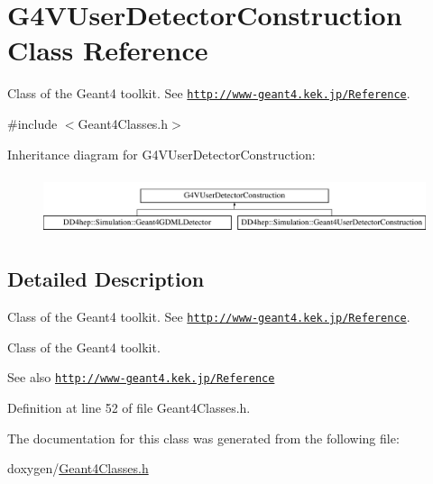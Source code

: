 \hypertarget{class_g4_v_user_detector_construction}{}\section{G4\+V\+User\+Detector\+Construction Class Reference}
\label{class_g4_v_user_detector_construction}


Class of the Geant4 toolkit. See \href{http://www-geant4.kek.jp/Reference}{\tt http\+://www-\/geant4.\+kek.\+jp/\+Reference}.  




{\ttfamily \#include $<$Geant4\+Classes.\+h$>$}

Inheritance diagram for G4\+V\+User\+Detector\+Construction\+:\begin{figure}[H]
\begin{center}
\leavevmode
\includegraphics[height=1.750000cm]{class_g4_v_user_detector_construction}
\end{center}
\end{figure}


\subsection{Detailed Description}
Class of the Geant4 toolkit. See \href{http://www-geant4.kek.jp/Reference}{\tt http\+://www-\/geant4.\+kek.\+jp/\+Reference}. 

Class of the Geant4 toolkit. \begin{DoxySeeAlso}{See also}
\href{http://www-geant4.kek.jp/Reference}{\tt http\+://www-\/geant4.\+kek.\+jp/\+Reference} 
\end{DoxySeeAlso}


Definition at line 52 of file Geant4\+Classes.\+h.



The documentation for this class was generated from the following file\+:\begin{DoxyCompactItemize}
\item 
doxygen/\hyperlink{_geant4_classes_8h}{Geant4\+Classes.\+h}\end{DoxyCompactItemize}
